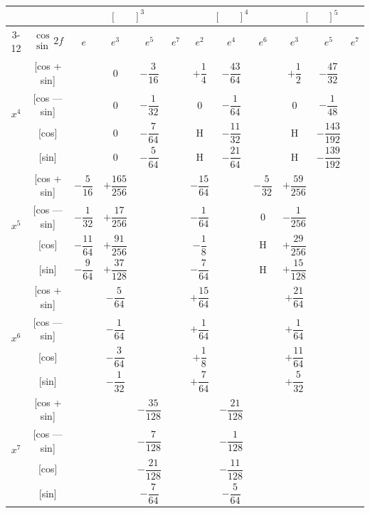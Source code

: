 \documentclass[11pt,a4paper]{book}
\begin{document}
\newpage


\begin{center}
\small
\begin{tabular}{|c|c|c|c|c|c|c|c|c|c|c|c|}
\hline
& & \multicolumn{4}{c|}{$[\phantom{()}]^3$} & \multicolumn{3}{c|}{$[\phantom{()}]^4$} & \multicolumn{3}{c|}{$[\phantom{()}]^5$} \\
\cline{3-12}
& $\begin{smallmatrix} \cos \\ \sin \end{smallmatrix} 2f$ & $e$ & $e^3$ & $e^5$ & $e^7$ & $e^2$ & $e^4$ & $e^6$ & $e^3$ & $e^5$ & $e^7$ \\
\hline
\multirow{4}{*}{$x^4$} & [cos + sin] & & $0$ & $-\dfrac{3}{16}$ & & $+\dfrac{1}{4}$ & $-\dfrac{43}{64}$ & & $+\dfrac{1}{2}$ & $-\dfrac{47}{32}$ \\
& [cos --- sin] & & $0$ & $-\dfrac{1}{32}$ & & $0$ & $-\dfrac{1}{64}$ & & $0$ & $-\dfrac{1}{48}$ \\
& [cos] & & $0$ & $-\dfrac{7}{64}$ & & H & $-\dfrac{11}{32}$ & & H & $-\dfrac{143}{192}$ \\
& [sin] & & $0$ & $-\dfrac{5}{64}$ & & H & $-\dfrac{21}{64}$ & & H & $-\dfrac{139}{192}$ \\
\hline
\multirow{4}{*}{$x^5$} & [cos + sin] & $-\dfrac{5}{16}$ & $+\dfrac{165}{256}$ & & & $-\dfrac{15}{64}$ & & $-\dfrac{5}{32}$ & $+\dfrac{59}{256}$ \\
& [cos --- sin] & $-\dfrac{1}{32}$ & $+\dfrac{17}{256}$ & & & $-\dfrac{1}{64}$ & & $0$ & $-\dfrac{1}{256}$ \\
& [cos] & $-\dfrac{11}{64}$ & $+\dfrac{91}{256}$ & & & $-\dfrac{1}{8}$ & & H & $+\dfrac{29}{256}$ \\
& [sin] & $-\dfrac{9}{64}$ & $+\dfrac{37}{128}$ & & & $-\dfrac{7}{64}$ & & H & $+\dfrac{15}{128}$ \\
\hline
\multirow{4}{*}{$x^6$} & [cos + sin] & & $-\dfrac{5}{64}$ & & & $+\dfrac{15}{64}$ & & & $+\dfrac{21}{64}$ \\
& [cos --- sin] & & $-\dfrac{1}{64}$ & & & $+\dfrac{1}{64}$ & & & $+\dfrac{1}{64}$ \\
& [cos] & & $-\dfrac{3}{64}$ & & & $+\dfrac{1}{8}$ & & & $+\dfrac{11}{64}$ \\
& [sin] & & $-\dfrac{1}{32}$ & & & $+\dfrac{7}{64}$ & & & $+\dfrac{5}{32}$ \\
\hline
\multirow{4}{*}{$x^7$} & [cos + sin] & & & $-\dfrac{35}{128}$ & & & $-\dfrac{21}{128}$ \\
& [cos --- sin] & & & $-\dfrac{7}{128}$ & & & $-\dfrac{1}{128}$ \\
& [cos] & & & $-\dfrac{21}{128}$ & & & $-\dfrac{11}{128}$ \\
& [sin] & & & $-\dfrac{7}{64}$ & & & $-\dfrac{5}{64}$ \\
\hline
\end{tabular}
\end{center}
\end{document}
